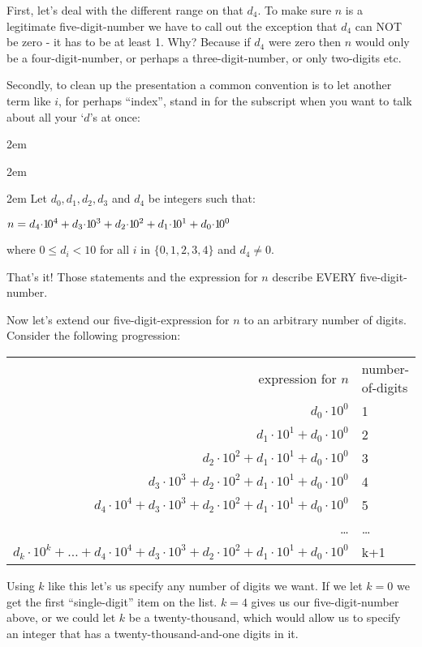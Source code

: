 \documentclass{article}
\newenvironment{jprIn}{\begin{adjustwidth}{2em}{}}{\end{adjustwidth}}
\begin{document}
First, let's deal with the different range on that $d_4$. To make sure $n$ is a
legitimate five-digit-number we have to
call out the exception that $d_4$ can NOT be zero - it has to be at least 1.
Why? Because if $d_4$ were zero then $n$ would only be a
four-digit-number, or perhaps a three-digit-number, or only two-digits etc.

Secondly, to clean up the presentation
a common convention
is to let another term like $i$, for perhaps ``index'', stand in for the subscript
when you want to talk about all your `$d$'s at once:
\begin{jprIn}
\begin{jprIn}
\begin{jprIn}
Let $d_0, d_1, d_2,d_3$ and $d_4$ be integers such that:

\hspace{3em}$n
=d_4{\cdot}{1\hspace{-0.12em}0}^4
+d_3{\cdot}{1\hspace{-0.12em}0}^3
+d_2{\cdot}{1\hspace{-0.12em}0}^2
+d_1{\cdot}{1\hspace{-0.12em}0}^1
+d_0{\cdot}{1\hspace{-0.12em}0}^0$

where $0\le{}d_i<10$ for all $i$ in $\{0,1,2,3,4\}$ and $d_4\ne0$.
\end{jprIn}
\end{jprIn}
\end{jprIn}
That's it! Those statements and the expression for $n$ describe EVERY five-digit-number.

Now let's extend
our five-digit-expression for $n$ to an arbitrary
number of digits.
Consider the following progression:
\begin{center}
\begin{tabular}{r l}
expression for $n$ & number-of-digits\\
$d_0{\cdot}10^0$ & 1\\
$d_1{\cdot}10^1+d_0{\cdot}10^0$ & 2\\
$d_2{\cdot}10^2+d_1{\cdot}10^1+d_0{\cdot}10^0$ & 3\\
$d_3{\cdot}10^3+d_2{\cdot}10^2+d_1{\cdot}10^1+d_0{\cdot}10^0$ & 4\\
$d_4{\cdot}10^4+d_3{\cdot}10^3+d_2{\cdot}10^2+d_1{\cdot}10^1+d_0{\cdot}10^0$ & 5\\
\dots{} & \dots{}\\
$d_k{\cdot}10^k+\dots{}+d_4{\cdot}10^4+d_3{\cdot}10^3+d_2{\cdot}10^2+d_1{\cdot}10^1+d_0{\cdot}10^0$ & k+1
\end{tabular}
\end{center}
Using $k$ like this let's us specify any number of digits we want.
If we let $k=0$ we get the first ``single-digit'' 
item on the list.  $k=4$ gives us our five-digit-number above,
or we could let $k$ be a twenty-thousand, which would allow
us to specify an integer that has a twenty-thousand-and-one
digits in it.
\end{document}
